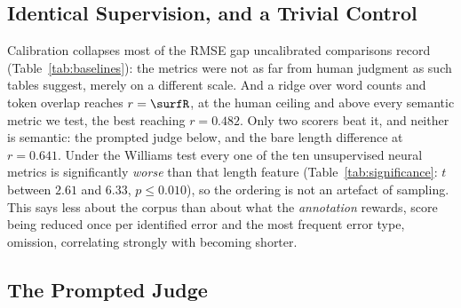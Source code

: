 \documentclass{BVP_JCLLT}
\begin{document}
\begin{table}
\centering
\caption{Calibrated comparison on the \textsc{FrJudge} test split ($\testN$
items), mean over 10 seeds. RMSE$_{\text{raw}}$ is the decimal-scaling protocol
in current use; RMSE$_{\text{cal}}$ fits an isotonic map on the training split.
$r$ and $\rho$ are both computed after calibration; being monotone, the map
leaves $\rho$ almost unchanged (at most $\isoDeltaRho$) but shifts $r$ by up to
$\isoDeltaR$.}\label{tab:baselines}
\small

\end{table}

\subsection{Identical Supervision, and a Trivial Control}\label{sec:baselines}

Calibration collapses most of the RMSE gap uncalibrated comparisons record
(Table~\ref{tab:baselines}): the metrics were not as far from human judgment as
such tables suggest, merely on a different scale. And a ridge over word counts
and token overlap reaches $r=\surfR$, at the human ceiling and above every
semantic metric we test, the best reaching $r=0.482$. Only two scorers beat it,
and neither is semantic: the prompted judge below, and the bare length
difference at $r=0.641$. Under the Williams test every one of the ten
unsupervised neural metrics is significantly \emph{worse} than that length
feature (Table~\ref{tab:significance}: $t$ between $2.61$ and $6.33$,
$p \leq 0.010$), so the ordering is not an artefact of sampling. This says less about the corpus than about what the
\emph{annotation} rewards, score being reduced once per identified error and the
most frequent error type, omission, correlating strongly with becoming shorter.

\begin{table}
\centering
\caption{Williams tests against the trivial length baseline
$\ell = -|\,|s|-|o|\,|$, which reaches $r=0.613$ with the human label $h$ over
all $297$ items. $r(m,\ell)$ is each metric's correlation with the length
feature itself, the dependence the test corrects for. Positive $t$ favours
$\ell$.}\label{tab:significance}
\footnotesize
\resizebox{\columnwidth}{!}{}
\end{table}

\subsection{The Prompted Judge}\label{sec:judge}
\end{document}
